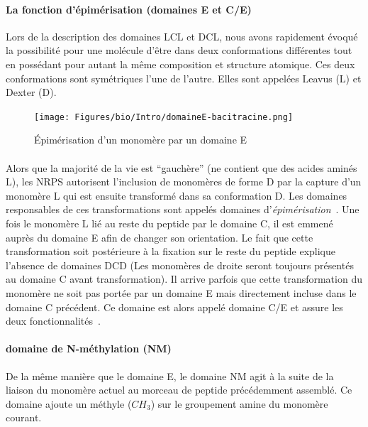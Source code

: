 \documentclass[12pt,french,twoside]{report}
\begin{document}
\paragraph{La fonction d'épimérisation (domaines E et C/E)}

Lors de la description des domaines LCL et DCL, nous avons rapidement évoqué la possibilité pour une molécule d'être dans deux conformations différentes tout en possédant pour autant la même composition et structure atomique.
Ces deux conformations sont symétriques l'une de l'autre.
Elles sont appelées Leavus (L) et Dexter (D).

\begin{figure}[h!]
  \begin{center}
    \texttt{[image: Figures/bio/Intro/domaineE-bacitracine.png]}
    \caption{\label{domaine_E}Épimérisation d'un monomère par un domaine E}
  \end{center}
\end{figure}

\paragraph{}Alors que la majorité de la vie est ``gauchère'' (ne contient que des acides aminés L), les NRPS autorisent l'inclusion de monomères de forme D par la capture d'un monomère L qui est ensuite transformé dans sa conformation D.
Les domaines responsables de ces transformations sont appelés domaines d'\textit{épimérisation}~\cite{calcott_portability_2015}.
Une fois le monomère L lié au reste du peptide par le domaine C, il est emmené auprès du domaine E afin de changer son orientation.
Le fait que cette transformation soit postérieure à la fixation sur le reste du peptide explique l'absence de domaines DCD (Les monomères de droite seront toujours présentés au domaine C avant transformation).
Il arrive parfois que cette transformation du monomère ne soit pas portée par un domaine E mais directement incluse dans le domaine C précédent.
Ce domaine est alors appelé domaine C/E et assure les deux fonctionnalités~\cite{yin_enduracidin_2006,balibar_generation_2005}.


\paragraph{domaine de N-méthylation (NM)}

De la même manière que le domaine E, le domaine NM agit à la suite de la liaison du monomère actuel au morceau de peptide précédemment assemblé.
Ce domaine ajoute un méthyle ($CH_{3}$) sur le groupement amine du monomère courant.
\end{document}
